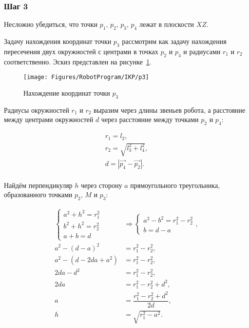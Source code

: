 \subsubsection*{Шаг 3}
Несложно убедиться, что точки $p_1$, $p_2$, $p_3$, $p_4$ лежат в плоскости $XZ$.

Задачу нахождения координат точки $p_3$ рассмотрим как задачу нахождения пересечения двух окружностей с центрами в точках $p_2$ и $p_4$ и радиусами $r_1$ и $r_2$ соответственно.
Эскиз представлен на рисунке~\ref{fig:RobotProgram:IKP:p3}.

\begin{figure}[H]
    \centering
    \vspace{14pt}
    \texttt{[image: Figures/RobotProgram/IKP/p3]}
    \caption{Нахождение координат точки $p_3$}
    \label{fig:RobotProgram:IKP:p3}
\end{figure}

Радиусы окружностей $r_1$ и $r_2$ выразим через длины звеньев робота, а расстояние между центрами окружностей $d$ через расстояние между точками $p_2$ и $p_4$:

\begin{gather*}
    r_1 = l_2, \\
    r_2 = \sqrt{l_3^2 + l_4^2}, \\
    d = \left| \overrightarrow{p_4} - \overrightarrow{p_2} \right|.
\end{gather*} \\

Найдём перпендикуляр $h$ через сторону $a$ прямоугольного треугольника, образованного точками $p_2$, $M$ и $p_3$:

\begin{align*}
    \begin{cases}
        a^2 + h^2 = r_1^2 \\
        b^2 + h^2 = r_2^2 \\
        a + b = d
    \end{cases} & \Rightarrow
    \begin{cases}
        a^2 - b^2 = r_1^2 - r_2^2 \\
        b = d - a
    \end{cases}, \\
    a^2 - \left( d - a \right)^2 &= r_1^2 - r_2^2, \\
    a^2 - \left( d - 2da + a^2 \right) &= r_1^2 - r_2^2, \\
    2da - d^2 &= r_1^2 - r_2^2, \\
    2da &= r_1^2 - r_2^2 + d^2, \\
    a &= \dfrac{r_1^2 - r_2^2 + d^2}{2d}, \\
    h &= \sqrt{r_1^2 - a^2}.
\end{align*} \\

